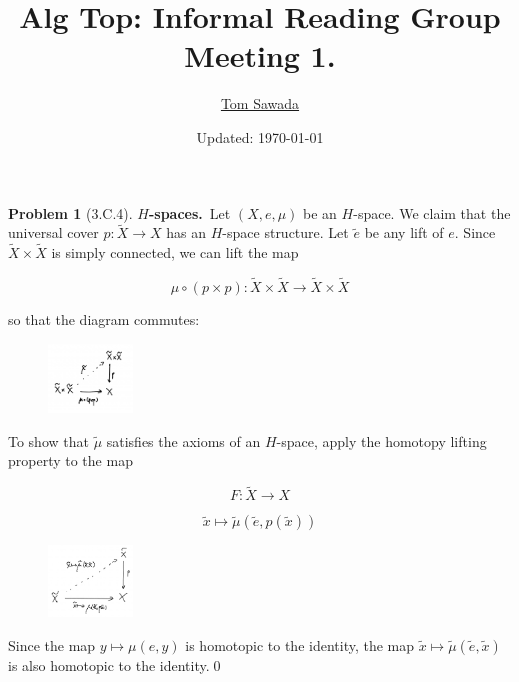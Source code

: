 \documentclass[10pt]{article}
\title{Alg Top: Informal Reading Group\\ Meeting 1.}
\date{Updated: \today}
\author{\href{tsawada7@gatech.edu}{Tom Sawada}}
\theoremstyle{definition}
\newtheorem*{problem}{Problem}
\begin{document}
\maketitle


\begin{problem}[3.C.4]
\textbf{$H$-spaces.}\ Let $(X,e,\mu)$ be an $H$-space. We claim that the universal cover $p: \tilde{X}\to X$ has an $H$-space structure. Let $\tilde{e}$ be any lift of $e$. Since $\tilde{X}\times \tilde{X}$ is simply connected, we can lift the map 

\begin{equation}
	\mu\circ (p\times p): \tilde{X} \times \tilde{X}\to \tilde{X}\times \tilde{X}
\end{equation}


so that the diagram commutes: 

\begin{figure}[h]
\centering
\includegraphics[width=0.2\textwidth]{image/3c4_mutilde_def.png}
\end{figure}


To show that $\tilde{\mu}$ satisfies the axioms of an $H$-space, apply the homotopy lifting property to the map 


\begin{equation}
	F: \tilde{X} \to X
\end{equation}

\begin{equation}
	\tilde{x}\mapsto \tilde{\mu}(\tilde{e},p(\tilde{x}))
\end{equation}

\begin{figure}[h]

\centering
\includegraphics[width=0.2\textwidth]{image/3c4_homotopy_lift.png}
\end{figure}

Since the map $y \mapsto \mu(e,y)$ is homotopic to the identity, the map $\tilde{x} \mapsto \tilde{\mu}(\tilde{e},\tilde{x})$ is also homotopic to the identity.\qed\\




\end{problem}
\end{document}
